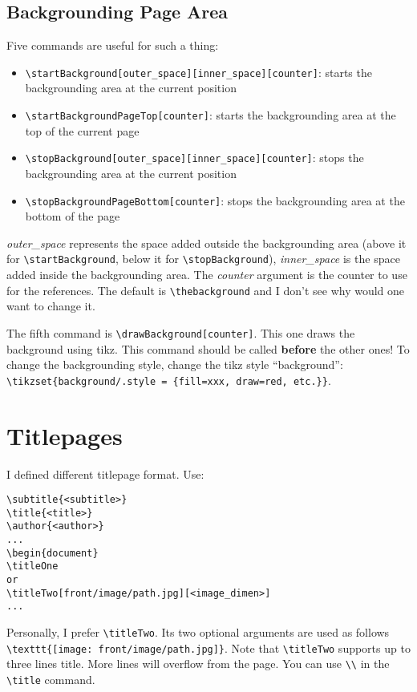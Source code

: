 \documentclass[a4paper, 11pt, oneside, fleqn]{article}
\begin{document}
	\subsection{Backgrounding Page Area}
	\label{sec:backgroundingPageArea}
	Five commands are useful for such a thing:
	\begin{itemize}
		\item \lstinline[breaklines]|\startBackground[outer_space][inner_space][counter]|: starts the backgrounding area at the current position
		\item \lstinline[breaklines]|\startBackgroundPageTop[counter]|: starts the backgrounding area at the top of the current page
		\item \lstinline[breaklines]|\stopBackground[outer_space][inner_space][counter]|: stops the backgrounding area at the current position
		\item \lstinline[breaklines]|\stopBackgroundPageBottom[counter]|: stops the backgrounding area at the bottom of the page
	\end{itemize}
	\textit{outer\_space} represents the space added outside the backgrounding area (above it for \lstinline[breaklines]|\startBackground|, below it for \lstinline[breaklines]|\stopBackground|), \textit{inner\_space} is the space added inside the backgrounding area. The \textit{counter} argument is the counter to use for the references. The default is \lstinline[breaklines]|\thebackground| and I don't see why would one want to change it.
	
	The fifth command is \lstinline[breaklines]|\drawBackground[counter]|. This one draws the background using tikz. This command should be called \textbf{before} the other ones! To change the backgrounding style, change the tikz style \enquote{background}: \lstinline[breaklines]|\tikzset{background/.style = {fill=xxx, draw=red, etc.}}|.
	
	\section{Titlepages}
	I defined different titlepage format. Use:
	\begin{lstlisting}
\subtitle{<subtitle>}
\title{<title>}
\author{<author>}
...
\begin{document}
\titleOne
or
\titleTwo[front/image/path.jpg][<image_dimen>]
...
	\end{lstlisting}
	
	Personally, I prefer \lstinline[breaklines]|\titleTwo|. Its two optional arguments are used as follows \lstinline[breaklines]|\texttt{[image: front/image/path.jpg]}|. Note that \lstinline[breaklines]|\titleTwo| supports up to three lines title. More lines will overflow from the page. You can use \lstinline[breaklines]|\\| in the \lstinline[breaklines]|\title| command.
	
\end{document}
